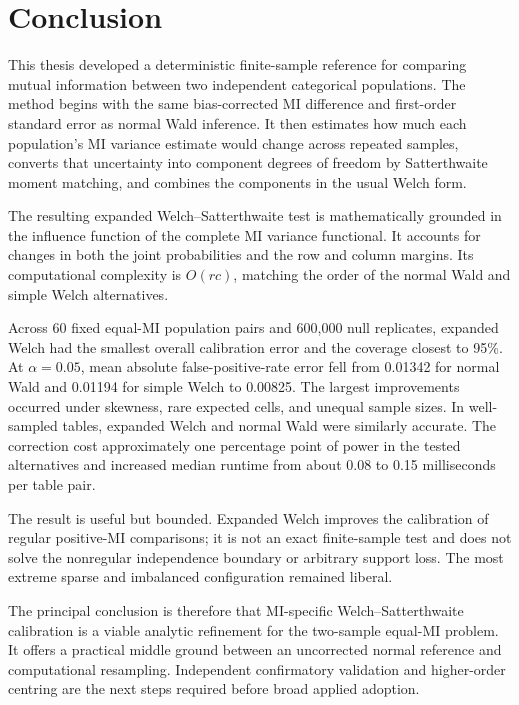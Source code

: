 \chapter{Conclusion}
\label{chap:conclusion}

This thesis developed a deterministic finite-sample reference for comparing
mutual information between two independent categorical populations. The
method begins with the same bias-corrected MI difference and first-order
standard error as normal Wald inference. It then estimates how much each
population's MI variance estimate would change across repeated samples,
converts that uncertainty into component degrees of freedom by Satterthwaite
moment matching, and combines the components in the usual Welch form.

The resulting expanded Welch--Satterthwaite test is mathematically grounded
in the influence function of the complete MI variance functional. It accounts
for changes in both the joint probabilities and the row and column margins.
Its computational complexity is $O(rc)$, matching the order of the normal
Wald and simple Welch alternatives.

Across 60 fixed equal-MI population pairs and 600,000 null replicates,
expanded Welch had the smallest overall calibration error and the coverage
closest to 95\%. At $\alpha=0.05$, mean absolute false-positive-rate error
fell from 0.01342 for normal Wald and 0.01194 for simple Welch to 0.00825. The
largest improvements occurred under skewness, rare expected cells, and
unequal sample sizes. In well-sampled tables, expanded Welch and normal Wald
were similarly accurate. The correction cost approximately one percentage
point of power in the tested alternatives and increased median runtime from
about 0.08 to 0.15 milliseconds per table pair.

The result is useful but bounded. Expanded Welch improves the calibration of
regular positive-MI comparisons; it is not an exact finite-sample test and
does not solve the nonregular independence boundary or arbitrary support
loss. The most extreme sparse and imbalanced configuration remained liberal.

The principal conclusion is therefore that MI-specific
Welch--Satterthwaite calibration is a viable analytic refinement for the
two-sample equal-MI problem. It offers a practical middle ground between an
uncorrected normal reference and computational resampling. Independent
confirmatory validation and higher-order centring are the next steps required
before broad applied adoption.
